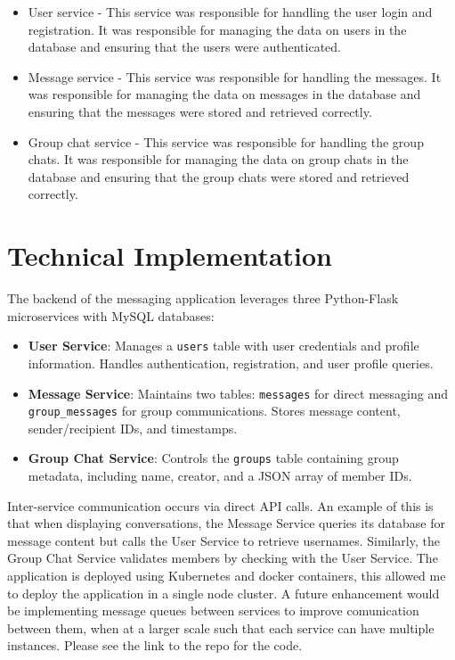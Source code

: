 \documentclass[12pt]{Article}
\begin{document}
\begin{itemize}
    \item User service - This service was responsible for handling the user login and registration. It was responsible for managing the data on users in the database and ensuring that the users were authenticated.
    \item Message service - This service was responsible for handling the messages. It was responsible for managing the data on messages in the database and ensuring that the messages were stored and retrieved correctly.
    \item Group chat service - This service was responsible for handling the group chats. It was responsible for managing the data on group chats in the database and ensuring that the group chats were stored and retrieved correctly.
\end{itemize}

\section{Technical Implementation}
The backend of the messaging application leverages three Python-Flask microservices with MySQL databases:

\begin{itemize}
    \item \textbf{User Service}: Manages a \texttt{users} table with user credentials and profile information. Handles authentication, registration, and user profile queries.
    
    \item \textbf{Message Service}: Maintains two tables: \texttt{messages} for direct messaging and \texttt{group\_messages} for group communications. Stores message content, sender/recipient IDs, and timestamps.
    
    \item \textbf{Group Chat Service}: Controls the \texttt{groups} table containing group metadata, including name, creator, and a JSON array of member IDs.
\end{itemize}

\noindent Inter-service communication occurs via direct API calls. An example of this is that when displaying conversations, the Message Service queries its database for message content but calls the User Service to retrieve usernames. Similarly, the Group Chat Service validates members by checking with the User Service.
The application is deployed using Kubernetes and docker containers, this allowed me to deploy the application in a single node cluster.
A future enhancement would be implementing message queues between services to improve comunication between them, when at a larger scale such that each service can have multiple instances.
Please see the link to the repo for the code.
\end{document}
